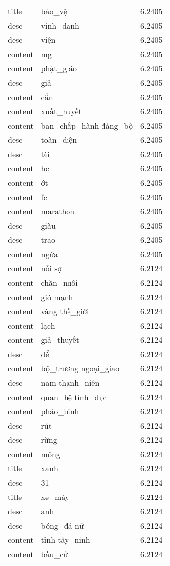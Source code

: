 \documentclass{article}
\begin{document}
\begin{tabular}{lll}
title & bảo\_vệ & 6.2405\\
desc & vinh\_danh & 6.2405\\
desc & viện & 6.2405\\
content & mg & 6.2405\\
content & phật\_giáo & 6.2405\\
desc & giả & 6.2405\\
content & cắn & 6.2405\\
content & xuất\_huyết & 6.2405\\
content & ban\_chấp\_hành đảng\_bộ & 6.2405\\
desc & toàn\_diện & 6.2405\\
desc & lái & 6.2405\\
content & hc & 6.2405\\
content & ớt & 6.2405\\
content & fc & 6.2405\\
content & marathon & 6.2405\\
desc & giàu & 6.2405\\
desc & trao & 6.2405\\
content & ngứa & 6.2405\\
content & nỗi sợ & 6.2124\\
content & chăn\_nuôi & 6.2124\\
content & gió mạnh & 6.2124\\
content & vàng thế\_giới & 6.2124\\
content & lạch & 6.2124\\
content & giả\_thuyết & 6.2124\\
desc & để & 6.2124\\
content & bộ\_trưởng ngoại\_giao & 6.2124\\
desc & nam thanh\_niên & 6.2124\\
content & quan\_hệ tình\_dục & 6.2124\\
content & pháo\_binh & 6.2124\\
desc & rút & 6.2124\\
desc & rừng & 6.2124\\
content & mông & 6.2124\\
title & xanh & 6.2124\\
desc & 31 & 6.2124\\
title & xe\_máy & 6.2124\\
desc & anh & 6.2124\\
desc & bóng\_đá nữ & 6.2124\\
content & tỉnh tây\_ninh & 6.2124\\
content & bầu\_cử & 6.2124\\

\end{tabular}
\end{document}
